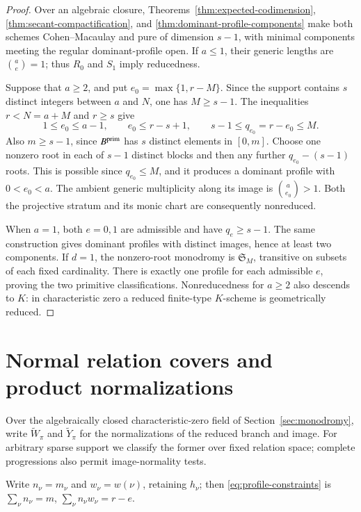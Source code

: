 \documentclass[10pt,fleqn]{article}
\numberwithin{equation}{section}
\begin{document}
\begin{proof}
Over an algebraic closure, Theorems~\ref{thm:expected-codimension},
\ref{thm:secant-compactification}, and
\ref{thm:dominant-profile-components} make both schemes
Cohen--Macaulay and pure of dimension $s-1$, with minimal components
meeting the regular dominant-profile open.  If $a\le1$, their generic
lengths are $\binom ae=1$; thus $R_0$ and $S_1$ imply reducedness.

Suppose that $a\ge2$, and put $e_0=\max\{1,r-M\}$.  Since the support
contains $s$ distinct integers between $a$ and $N$, one has $M\ge s-1$.
The inequalities $r<N=a+M$ and $r\ge s$ give
\[
 1\le e_0\le a-1,\qquad e_0\le r-s+1,\qquad
 s-1\le q_{e_0}=r-e_0\le M.
\]
Also $m\ge s-1$, since $B^{\rm prim}$ has $s$ distinct elements
in $[0,m]$.  Choose one nonzero root in each
of $s-1$ distinct blocks and then any further $q_{e_0}-(s-1)$ roots.
This is possible since $q_{e_0}\le M$, and it produces a dominant
profile with $0<e_0<a$.  The ambient generic multiplicity along its
image is $\binom a{e_0}>1$.  Both the projective stratum and its monic
chart are consequently nonreduced.

When $a=1$, both $e=0,1$ are admissible and have $q_e\ge s-1$.
The same construction gives dominant profiles with distinct images,
hence at least two components.  If $d=1$, the nonzero-root monodromy is
$\mathfrak S_M$, transitive on subsets of each fixed cardinality.
There is exactly one profile for each admissible $e$, proving the two
primitive classifications.  Nonreducedness for $a\ge2$ also descends
to $K$: in characteristic zero a reduced finite-type $K$-scheme is
geometrically reduced.
\end{proof}


\section{Normal relation covers and product normalizations}\label{sec:normalization}
\label{v6:norm:section}

Over the algebraically closed characteristic-zero field of
Section~\ref{sec:monodromy}, write $\widetilde W_\pi$ and
$\widetilde Y_\pi$ for the normalizations of the reduced branch and image.
For arbitrary sparse support we classify the former over fixed
relation space; complete progressions also permit image-normality tests.

Write $n_\nu=m_\nu$ and $w_\nu=w(\nu)$, retaining $h_\nu$;
then \eqref{eq:profile-constraints} is
$\sum_\nu n_\nu=m$, $\sum_\nu n_\nu w_\nu=r-e$.
\end{document}
